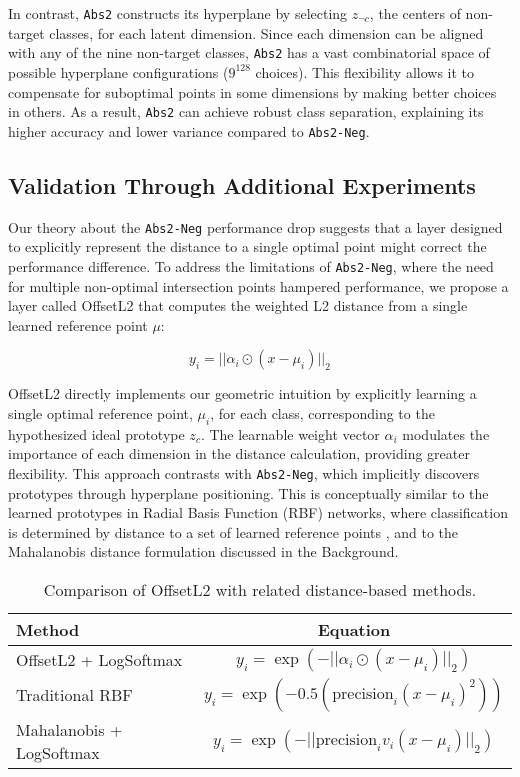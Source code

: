 In contrast, \texttt{Abs2} constructs its hyperplane by selecting $z_{\neg c}$, the centers of non-target classes, for each latent dimension. Since each dimension can be aligned with any of the nine non-target classes, \texttt{Abs2} has a vast combinatorial space of possible hyperplane configurations ($9^{128}$ choices). This flexibility allows it to compensate for suboptimal points in some dimensions by making better choices in others. As a result, \texttt{Abs2} can achieve robust class separation, explaining its higher accuracy and lower variance compared to \texttt{Abs2-Neg}.

\subsection{Validation Through Additional Experiments}

Our theory about the \texttt{Abs2-Neg} performance drop suggests that a layer designed to explicitly represent the distance to a single optimal point might correct the performance difference. To address the limitations of \texttt{Abs2-Neg}, where the need for multiple non-optimal intersection points hampered performance, we propose a layer called OffsetL2 that computes the weighted L2 distance from a single learned reference point $\mu$:

\[
y_i = || \alpha_i \odot (x - \mu_i) ||_2
\]

OffsetL2 directly implements our geometric intuition by explicitly learning a single optimal reference point, $\mu_i$, for each class, corresponding to the hypothesized ideal prototype $z_c$. The learnable weight vector $\alpha_i$ modulates the importance of each dimension in the distance calculation, providing greater flexibility. This approach contrasts with \texttt{Abs2-Neg}, which implicitly discovers prototypes through hyperplane positioning. This is conceptually similar to the learned prototypes in Radial Basis Function (RBF) networks, where classification is determined by distance to a set of learned reference points \cite{moody1989fast}, and to the Mahalanobis distance formulation discussed in the Background.

\begin{table}[H]
    \centering
    \begin{tabular}{lc}
        \toprule
        \textbf{Method} & \textbf{Equation} \\
        \midrule
        OffsetL2 + LogSoftmax & $ y_i = \exp(-||\alpha_i \odot (x - \mu_i) ||_2) $ \\  
        Traditional RBF & $ y_i = \exp(-0.5 (\text{precision}_i (x - \mu_i)^2)) $ \\  
        Mahalanobis + LogSoftmax & $ y_i = \exp(-||\text{precision}_i v_i (x - \mu_i)||_2) $ \\  
        \bottomrule
    \end{tabular}
    \caption{Comparison of OffsetL2 with related distance-based methods.}
    \label{tab:comparison_offsetl2}
\end{table}

